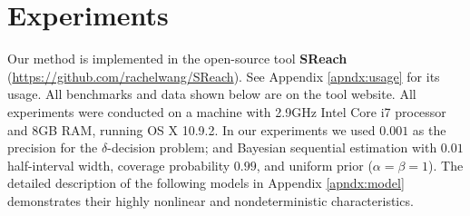 \section{Experiments}
\vspace{-.1cm}
Our method is implemented in the open-source tool {\bf SReach} (\url{https://github.com/rachelwang/SReach}). See Appendix \ref{apndx:usage} for its usage. All benchmarks and data shown below are on the tool website. All experiments were conducted on a machine with 2.9GHz Intel Core i7 processor and 8GB RAM, running OS X 10.9.2. 
In our experiments we used $0.001$ as the precision for the $\delta$-decision problem; and Bayesian sequential estimation
with $0.01$ half-interval width, coverage probability $0.99$, and uniform prior ($\alpha = \beta = 1$). The 
detailed description of the following models in Appendix \ref{apndx:model} demonstrates their highly nonlinear and nondeterministic characteristics.

